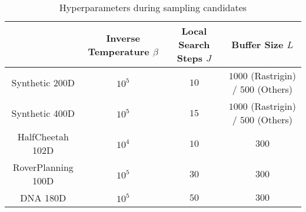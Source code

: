 \begin{table}[ht]
\centering
\caption{Hyperparameters during sampling candidates}
\begin{tabular}{c c c c}\toprule
                    &Inverse Temperature $\beta$    &Local Search Steps $J$ &Buffer Size $L$    \\\midrule
Synthetic 200D      &$10^5$                 &$10$                   &$1000$ (Rastrigin) / $500$ (Others)              \\
Synthetic 400D      &$10^5$                 &$15$                   &$1000$ (Rastrigin) / $500$ (Others)             \\
\midrule
HalfCheetah 102D    &$10^4$                 &$10$                   &$300$              \\
RoverPlanning 100D  &$10^5$                 &$30$                   &$300$              \\
DNA 180D            &$10^5$                 &$50$                   &$300$              \\\bottomrule


\end{tabular}
\label{table:candidate selection}
\end{table}